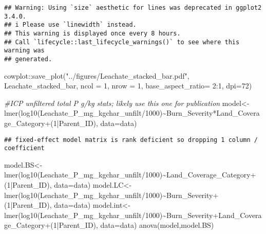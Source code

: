 \documentclass[
]{article}
\newenvironment{Shaded}{\begin{snugshade}}{\end{snugshade}}
\newcommand{\AttributeTok}[1]{\textcolor[rgb]{0.77,0.63,0.00}{#1}}
\newcommand{\CommentTok}[1]{\textcolor[rgb]{0.56,0.35,0.01}{\textit{#1}}}
\newcommand{\DecValTok}[1]{\textcolor[rgb]{0.00,0.00,0.81}{#1}}
\newcommand{\FunctionTok}[1]{\textcolor[rgb]{0.00,0.00,0.00}{#1}}
\newcommand{\NormalTok}[1]{#1}
\newcommand{\OtherTok}[1]{\textcolor[rgb]{0.56,0.35,0.01}{#1}}
\newcommand{\SpecialCharTok}[1]{\textcolor[rgb]{0.00,0.00,0.00}{#1}}
\newcommand{\StringTok}[1]{\textcolor[rgb]{0.31,0.60,0.02}{#1}}
\begin{document}
\begin{verbatim}
## Warning: Using `size` aesthetic for lines was deprecated in ggplot2 3.4.0.
## i Please use `linewidth` instead.
## This warning is displayed once every 8 hours.
## Call `lifecycle::last_lifecycle_warnings()` to see where this warning was
## generated.
\end{verbatim}

\begin{Shaded}
\begin{Highlighting}[]
\NormalTok{cowplot}\SpecialCharTok{::}\FunctionTok{save\_plot}\NormalTok{(}\StringTok{"../figures/Leachate\_stacked\_bar.pdf"}\NormalTok{, Leachate\_stacked\_bar, }\AttributeTok{ncol =} \DecValTok{1}\NormalTok{, }\AttributeTok{nrow =} \DecValTok{1}\NormalTok{, }\AttributeTok{base\_aspect\_ratio=} \DecValTok{2}\SpecialCharTok{:}\DecValTok{1}\NormalTok{, }\AttributeTok{dpi=}\DecValTok{72}\NormalTok{)}


\CommentTok{\#ICP unfiltered total P g/kg stats; likely use this one for publication}
\NormalTok{model}\OtherTok{\textless{}{-}}\FunctionTok{lmer}\NormalTok{(}\FunctionTok{log10}\NormalTok{(Leachate\_P\_mg\_kgchar\_unfilt}\SpecialCharTok{/}\DecValTok{1000}\NormalTok{)}\SpecialCharTok{\textasciitilde{}}\NormalTok{Burn\_Severity}\SpecialCharTok{*}\NormalTok{Land\_Coverage\_Category}\SpecialCharTok{+}\NormalTok{(}\DecValTok{1}\SpecialCharTok{|}\NormalTok{Parent\_ID), }\AttributeTok{data=}\NormalTok{data)}
\end{Highlighting}
\end{Shaded}

\begin{verbatim}
## fixed-effect model matrix is rank deficient so dropping 1 column / coefficient
\end{verbatim}

\begin{Shaded}
\begin{Highlighting}[]
\NormalTok{model.BS}\OtherTok{\textless{}{-}}\FunctionTok{lmer}\NormalTok{(}\FunctionTok{log10}\NormalTok{(Leachate\_P\_mg\_kgchar\_unfilt}\SpecialCharTok{/}\DecValTok{1000}\NormalTok{)}\SpecialCharTok{\textasciitilde{}}\NormalTok{Land\_Coverage\_Category}\SpecialCharTok{+}\NormalTok{(}\DecValTok{1}\SpecialCharTok{|}\NormalTok{Parent\_ID), }\AttributeTok{data=}\NormalTok{data)}
\NormalTok{model.LC}\OtherTok{\textless{}{-}}\FunctionTok{lmer}\NormalTok{(}\FunctionTok{log10}\NormalTok{(Leachate\_P\_mg\_kgchar\_unfilt}\SpecialCharTok{/}\DecValTok{1000}\NormalTok{)}\SpecialCharTok{\textasciitilde{}}\NormalTok{Burn\_Severity}\SpecialCharTok{+}\NormalTok{(}\DecValTok{1}\SpecialCharTok{|}\NormalTok{Parent\_ID), }\AttributeTok{data=}\NormalTok{data)}
\NormalTok{model.int}\OtherTok{\textless{}{-}}\FunctionTok{lmer}\NormalTok{(}\FunctionTok{log10}\NormalTok{(Leachate\_P\_mg\_kgchar\_unfilt}\SpecialCharTok{/}\DecValTok{1000}\NormalTok{)}\SpecialCharTok{\textasciitilde{}}\NormalTok{Burn\_Severity}\SpecialCharTok{+}\NormalTok{Land\_Coverage\_Category}\SpecialCharTok{+}\NormalTok{(}\DecValTok{1}\SpecialCharTok{|}\NormalTok{Parent\_ID), }\AttributeTok{data=}\NormalTok{data)}
\FunctionTok{anova}\NormalTok{(model,model.BS)}
\end{Highlighting}
\end{Shaded}
\end{document}
